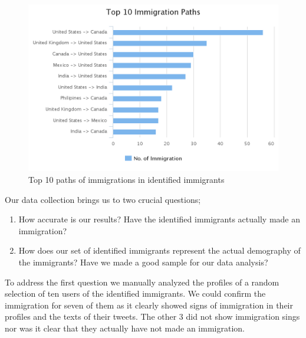 \documentclass{article}
\begin{document}
\begin{figure}[ht]
\vskip 0.2in
\begin{center}
\centerline{\includegraphics[width=\columnwidth]{Figures/top10routes.png}}
\caption{Top 10 paths of immigrations in identified immigrants}
\label{imm_path}
\end{center}
\vskip -0.2in
\end{figure} 


Our data collection brings us to two crucial questions; 

\begin{enumerate}
    \item How accurate is our results? Have the identified immigrants actually made an immigration?
    \item How does our set of identified immigrants represent the actual demography of the immigrants? Have we made a good sample for our data analysis?
\end{enumerate}

To address the first question we manually analyzed the profiles of a random selection of ten users of the identified immigrants. We could confirm the immigration for seven of them as it clearly showed signs of immigration in their profiles and the texts of their tweets. The other 3 did not show immigration sings nor was it clear that they actually have not made an immigration. 
\end{document}
